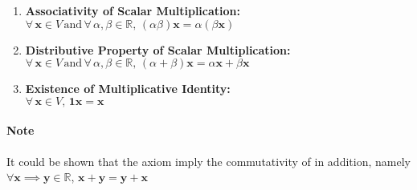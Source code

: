 \documentclass[11pt]{article}
\begin{document}
\begin{definition}
\begin{enumerate}
\begin{enumerate}
            \item \textbf{Associativity of Scalar Multiplication:} \\
            $\forall \, \textbf{x} \in V \, \text{and} \, \forall \, \alpha, \beta \in \mathbb{R}, \, (\alpha \beta) \textbf{x} = \alpha (\beta \textbf{x})$
            
            \item \textbf{Distributive Property of Scalar Multiplication:} \\
            $\forall \, \textbf{x} \in V \, \text{and} \, \forall \, \alpha, \beta \in \mathbb{R}, \, (\alpha + \beta) \textbf{x} = \alpha \textbf{x} + \beta \textbf{x}$
            
            \item \textbf{Existence of Multiplicative Identity:} \\
            $\forall \, \textbf{x} \in V, \, \textbf{1} \textbf{x} = \textbf{x}$
        \end{enumerate}
    \end{enumerate}
     
    \paragraph{Note} It could be shown that the axiom imply the commutativity of in addition, namely $\forall \textbf{x} \implies \textbf{y} \in \mathbb{R}$, $\textbf{x} + \textbf{y} = \textbf{y} + \textbf{x}$
\end{definition}
\end{document}
